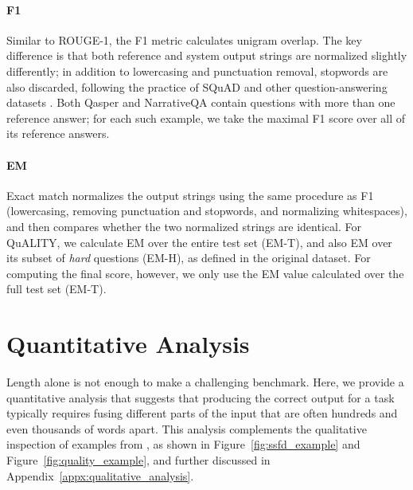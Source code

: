 \paragraph{F1}
Similar to ROUGE-1, the F1 metric calculates unigram overlap. The key difference is that both reference and system output strings are normalized slightly differently; in addition to lowercasing and punctuation removal, stopwords are also discarded, following the practice of SQuAD \cite{rajpurkar-etal-2016-squad} and other question-answering datasets \cite{fisch-etal-2019-mrqa}. Both Qasper and NarrativeQA contain questions with more than one reference answer; for each such example, we take the maximal F1 score over all of its reference answers.

\paragraph{EM}
Exact match normalizes the output strings using the same procedure as F1 (lowercasing, removing punctuation and stopwords, and normalizing whitespaces), and then compares whether the two normalized strings are identical. For QuALITY, we calculate EM over the entire test set (EM-T), and also EM over its subset of \textit{hard} questions (EM-H), as defined in the original dataset. For computing the final \scrolls{} score, however, we only use the EM value calculated over the full test set (EM-T).

\section{Quantitative Analysis}

Length alone is not enough to make \scrolls{} a challenging benchmark. Here, we provide a quantitative analysis that suggests that producing the correct output for a \scrolls{} task typically requires fusing different parts of the input that are often hundreds and even thousands of words apart. This analysis complements the qualitative inspection of examples from \scrolls{}, as shown in Figure~\ref{fig:ssfd_example} and Figure~\ref{fig:quality_example}, and further discussed in Appendix~\ref{appx:qualitative_analysis}.

